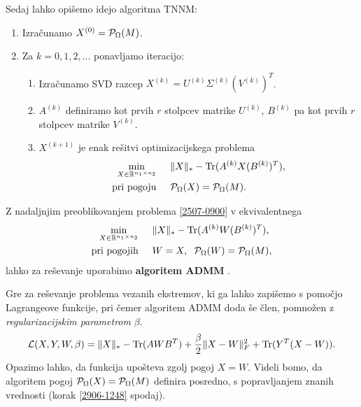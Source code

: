 Sedaj lahko opišemo idejo algoritma TNNM:
\begin{enumerate}
    \item Izračunamo $X^{(0)} = \mathcal{P}_\Omega(M)$.
    \item Za $k=0,1,2,\ldots$ ponavljamo iteracijo:
    \begin{enumerate}
        \item Izračunamo SVD razcep
            $X^{(k)} = U^{(k)} \Sigma^{(k)} (V^{(k)})^T$.
        \item $A^{(k)}$ definiramo kot prvih    $r$ stolpcev matrike $U^{(k)}$,   
            $B^{(k)}$ pa kot prvih    
            $r$ stolpcev matrike $V^{(k)}$.
        \item $X^{(k+1)}$ je enak rešitvi 
            optimizacijskega problema 
    \begin{align}
    \label{2507-0900}
    \begin{split}
    \min_{X\in  \mathbb{R}^{n_1 \times n_2}} \hspace{0.5cm}         & \lVert X\rVert_* - \operatorname{Tr}(A^{(k)}X(B^{(k)})^T), \\
    \text{pri pogoju} \hspace{0.5cm} & \mathcal{P}_\Omega(X) = \mathcal{P}_\Omega(M).
    \end{split}
    \end{align}
    \end{enumerate}
\end{enumerate}
Z nadaljnjim preoblikovanjem problema 
\eqref{2507-0900} v ekvivalentnega 
\begin{align}
\label{1307-1527} 
\begin{split}
    \min_{X\in  \mathbb{R}^{n_1 \times n_2}}  \hspace{0.5cm}         & \lVert X\rVert_* - \operatorname{Tr}(A^{(k)}W(B^{(k)})^T),  \\
    \text{pri pogojih} \hspace{0.5cm} & W=X, \hspace{0.2cm} \mathcal{P}_\Omega(W) = \mathcal{P}_\Omega(M),
\end{split}
\end{align}
lahko za reševanje uporabimo \textbf{algoritem ADMM} \cite{TNNM-HZYLH12}.

Gre za reševanje problema vezanih ekstremov, ki ga lahko zapišemo s pomočjo Lagrangeove funkcije, pri čemer algoritem ADMM doda še 
člen, pomnožen z \textit{regularizacijskim parametrom} $\beta$. 
\[
    \mathcal{L}(X, Y, W, \beta) = \lVert X\rVert_* - \operatorname{Tr}(A W B^T) + \frac{\beta}{2} \lVert X - W\rVert_F^2 + \operatorname{Tr}(Y^T(X-W)).
\]
 Opazimo lahko, da funkcija upošteva zgolj pogoj $X = W$. Videli bomo, da algoritem pogoj $\mathcal{P}_\Omega(X) = \mathcal{P}_\Omega(M)$ definira posredno, s popravljanjem znanih vrednosti (korak \eqref{2906-1248} spodaj).%

